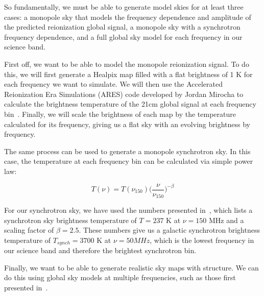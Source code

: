 So fundamentally, we must be able to generate model skies for at least three 
cases: a monopole sky that models the frequency dependence and amplitude of the 
predicted reionization global signal, a monopole sky with a synchrotron 
frequency dependence, and a full global sky model for each frequency in our 
science band.

First off, we want to be able to model the monopole reionization signal. To do 
this, we will first generate a Healpix map filled with a flat brightness of 1 K 
for each frequency we want to simulate. We will then use the Accelerated 
Reionization Era Simulations (ARES) code developed by Jordan Mirocha to 
calculate the brightness temperature of the 21cm global signal at each 
frequency bin~\citep{mirocha2014}. Finally, we will scale the brightness of 
each map by the temperature calculated for its frequency, giving us a flat sky 
with an evolving brightness by frequency.

The same process can be used to generate a monopole synchrotron sky. In this 
case, the temperature at each frequency bin can be calculated via simple power 
law:

\begin{equation}
    \label{eq:synch-temp}
    T(\nu) = T(\nu_{150}) \Big(\frac{\nu}{\nu_{150}} \Big)^{-\beta}
\end{equation}

For our synchrotron sky, we have used the numbers presented 
in~\cite{rogers2008}, which lists a synchrotron sky brightness temperature of 
$T = 237$ K at $\nu = 150$ MHz and a scaling factor of $\beta = 2.5$. These 
numbers give us a galactic synchrotron brightness temperature of $T_{synch} = 
3700$ K at $\nu = 50 MHz$, which is the lowest frequency in our science band 
and therefore the brightest synchrotron bin. 

Finally, we want to be able to generate realistic sky maps with structure. We 
can do this using global sky models at multiple frequencies, such as those 
first presented in~\cite{haslam1982}.
